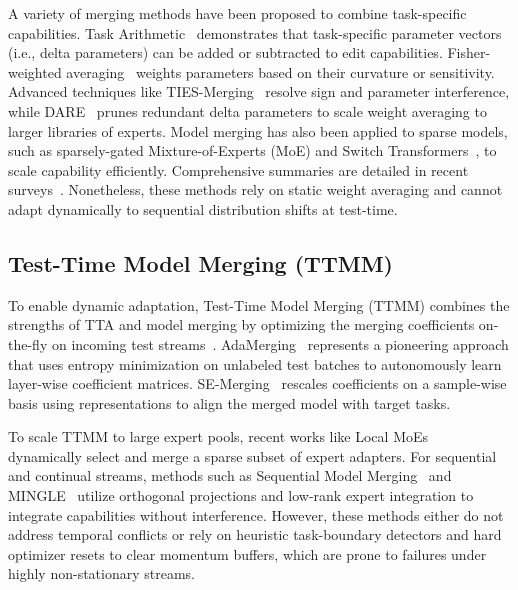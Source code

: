 \documentclass{article}
\theoremstyle{plain}
\theoremstyle{definition}
\theoremstyle{remark}
\begin{document}
A variety of merging methods have been proposed to combine task-specific capabilities. Task Arithmetic~\citep{ilharco2022editing} demonstrates that task-specific parameter vectors (i.e., delta parameters) can be added or subtracted to edit capabilities. Fisher-weighted averaging~\citep{matena2022merging} weights parameters based on their curvature or sensitivity. Advanced techniques like TIES-Merging~\citep{yadav2023ties} resolve sign and parameter interference, while DARE~\citep{yadav2024dare} prunes redundant delta parameters to scale weight averaging to larger libraries of experts. Model merging has also been applied to sparse models, such as sparsely-gated Mixture-of-Experts (MoE) and Switch Transformers~\citep{shazeer2017outrageously,fedus2021switch}, to scale capability efficiently. Comprehensive summaries are detailed in recent surveys~\citep{gu2023model,jin2023dusk}. Nonetheless, these methods rely on static weight averaging and cannot adapt dynamically to sequential distribution shifts at test-time.

\subsection{Test-Time Model Merging (TTMM)}
To enable dynamic adaptation, Test-Time Model Merging (TTMM) combines the strengths of TTA and model merging by optimizing the merging coefficients on-the-fly on incoming test streams~\citep{lu2024test}. AdaMerging~\citep{lu2024test} represents a pioneering approach that uses entropy minimization on unlabeled test batches to autonomously learn layer-wise coefficient matrices. SE-Merging~\citep{june2025se} rescales coefficients on a sample-wise basis using representations to align the merged model with target tasks.

To scale TTMM to large expert pools, recent works like Local MoEs~\citep{bertolissi2025local} dynamically select and merge a sparse subset of expert adapters. For sequential and continual streams, methods such as Sequential Model Merging~\citep{tang2025merging} and MINGLE~\citep{qiu2025mingle} utilize orthogonal projections and low-rank expert integration to integrate capabilities without interference. However, these methods either do not address temporal conflicts or rely on heuristic task-boundary detectors and hard optimizer resets to clear momentum buffers, which are prone to failures under highly non-stationary streams.
\end{document}
